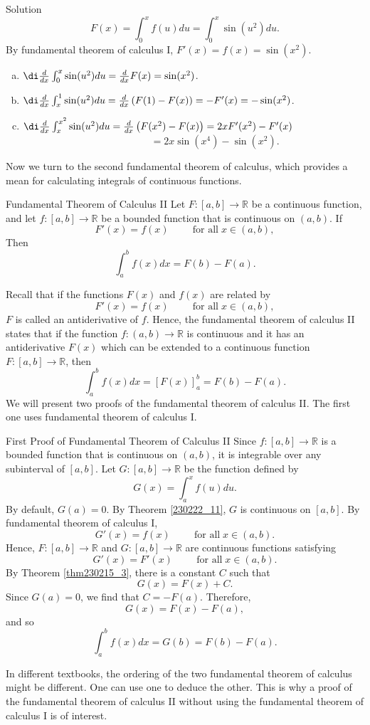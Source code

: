 \begin{example}[label=20230527]{}
\begin{solution}{Solution}
\[F(x)=\int_0^xf(u)du=\int_0^x\sin(u^2)du.\]\bs
 By fundamental theorem of calculus I, $F'(x)=f(x)=\sin(x^2)$.
\begin{enumerate}[(a)]
\item$\di \frac{d}{dx}\int_0^x\sin(u^2)du=\frac{d}{dx}F(x) =\sin (x^2)$.
\item $\di \frac{d}{dx}\int_x^{1}\sin(u^2)du=\frac{d}{dx}\left(F(1)-F(x)\right) =-F'(x)= -\sin(x^2)$.
\item $\di \frac{d}{dx}\int_x^{x^2}\sin(u^2)du=\frac{d}{dx}\left(F(x^2)-F(x)\right)=2xF'(x^2)-F'(x) $\\~$~\hspace{5cm}~$$=2x\sin(x^4)-\sin(x^2)$.
\end{enumerate}

\end{solution}

Now we turn to the second fundamental theorem of calculus, which provides a mean for   calculating integrals of continuous functions.
\begin{theorem}{Fundamental Theorem of Calculus II}
Let $F:[a,b]\to\mathbb{R}$ be a continuous function, and let $f:[a,b]\to\mathbb{R}$ be a bounded function that is continuous on $(a,b)$. If 
\[F'(x)=f(x)\hspace{1cm}\text{for all}\;x\in (a,b),\]
Then
\[\int_a^b f(x)dx=F(b)-F(a).\]
\end{theorem}
Recall that if the functions $F(x)$ and $f(x)$ are related by
\[F'(x)=f(x)\hspace{1cm}\text{for all}\;x\in (a,b),\]$F$ is called an antiderivative of $f$. Hence, the fundamental theorem of calculus II states that if the function $f:(a,b)\to\mathbb{R}$ is continuous and it has an antiderivative $F(x)$ which can be extended to a continuous function $F:[a,b]\to\mathbb{R}$, then 
\[\int_a^bf(x)dx=\left[ F(x)\right]_{ a}^{ b}=F(b)-F(a).\]
We will present two proofs of the fundamental theorem of calculus II. The first one uses fundamental theorem of calculus I.
\begin{myproof}{First  Proof of Fundamental Theorem of Calculus II}
Since $f:[a,b]\to\mathbb{R}$ is a bounded function that is continuous on $(a,b)$, it is integrable over any subinterval of $[a,b]$. Let $G:[a,b]\to\mathbb{R}$ be the function defined by
\[G(x)=\int_a^xf(u)du.\]By default, $G(a)=0$.  By Theorem \ref{230222_11}, $G$ is continuous on $[a,b]$.  By fundamental theorem of calculus I, 
\[G'(x)=f(x)\hspace{1cm} \text{for all}\;x\in (a,b).\]Hence, $F:[a,b]\to\mathbb{R}$ and $G:[a,b]\to\mathbb{R}$ are continuous functions satisfying
\[G'(x)=F'(x)\hspace{1cm} \text{for all}\;x\in (a,b).\] By Theorem \ref{thm230215_3}, there is a constant $C$ such that 
\[G(x)=F(x)+C.\]
Since $G(a)=0$, we find that 
$C=-F(a)$. Therefore, 
\[G(x)=F(x)-F(a),\]and so
\[\int_a^bf(x)dx=G(b)=F(b)-F(a).\]
\end{myproof}
In different textbooks, the ordering of the two fundamental theorem of calculus might be different. One can use one to deduce the other. This is why a   proof of the fundamental theorem of calculus II without using the fundamental theorem of calculus I is of interest.



\end{example}
